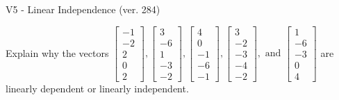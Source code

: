\begin{exercise}
  \begin{exerciseTitle}V5 - Linear Independence (ver. 284)\end{exerciseTitle}
  \begin{exerciseStatement}
    Explain why the vectors \(\left[\begin{array}{r}
-1 \\
-2 \\
2 \\
0 \\
2
\end{array}\right] , \left[\begin{array}{r}
3 \\
-6 \\
1 \\
-3 \\
-2
\end{array}\right] , \left[\begin{array}{r}
4 \\
0 \\
-1 \\
-6 \\
-1
\end{array}\right] , \left[\begin{array}{r}
3 \\
-2 \\
-3 \\
-4 \\
-2
\end{array}\right] , \text{ and } \left[\begin{array}{r}
1 \\
-6 \\
-3 \\
0 \\
4
\end{array}\right]\) are linearly dependent or linearly independent.	



\end{exerciseStatement}
\end{exercise}
